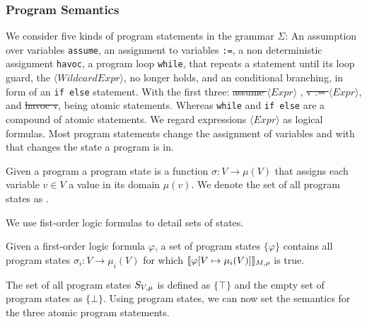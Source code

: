\subsubsection{Program Semantics}
We consider five kinds of program statements in the grammar $\Sigma$: An assumption over variables \texttt{assume}, an assignment to variables \texttt{:=}, a non deterministic assignment \texttt{havoc}, a program loop \texttt{while}, that repeats a statement until its loop guard, the $\langle WildcardExpr \rangle$, no longer holds, and an conditional branching, in form of an \texttt{if else} statement. With the first three: \st{assume $\langle Expr \rangle$ }, \st{v := $\langle Expr \rangle$}, and \st{havoc v}, being atomic statements. Whereas \texttt{while} and \texttt{if else} are a compound of atomic statements.
We regard expressions $\langle Expr \rangle$ as logical formulas. Most program statements change the assignment of variables and with that changes the state a program is in. 
\begin{mydef}
	Given a program \prg a program state is a function $\sigma: V \rightarrow \mu(V)$ that assigns each variable $v \in V$ a value in its domain $\mu(v)$. We denote the set of all program states as \stateSpace.
\end{mydef}
We use fist-order logic formulas to detail sets of states.
\begin{mydef}
	Given a first-order logic formula $\varphi$, a set of program states $\{ \varphi \}$ contains all program states $\sigma_i: V \rightarrow \mu_i(V)$ for which $\llbracket \varphi [V\mapsto \mu_i(V) ] \rrbracket_{M, \rho}$ is true.
\end{mydef}
The set of all program states $S_{V, \mu}$ is defined as $\{\top\}$ and the empty set of program states as $\{\bot\}$.
Using program states, we can now set the semantics for the three atomic program statements.
